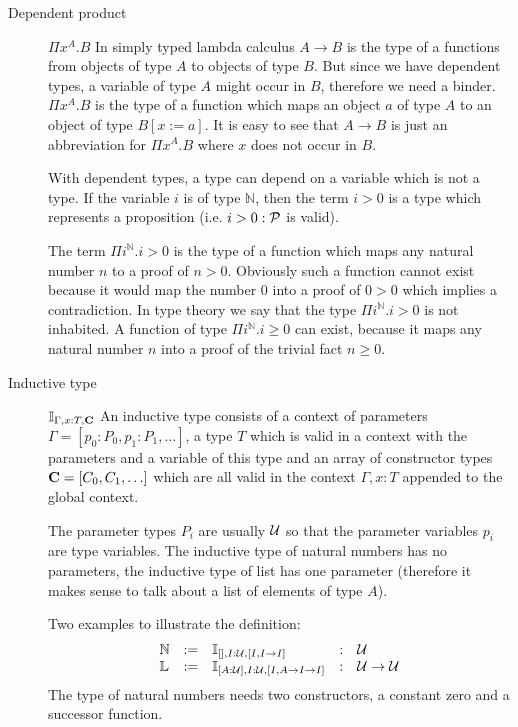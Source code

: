 \begin{description}
\item[Dependent product] $\Pi x^A.B$ In simply typed lambda calculus
  $A \to B$ is the type of a functions from objects of type $A$ to objects of
  type $B$. But since we have dependent types, a variable of type $A$ might
  occur in $B$, therefore we need a binder. $\Pi x^A. B$ is the type of a
  function which maps an object $a$ of type $A$ to an object of type
  $B[x:=a]$. It is easy to see that $A \to B$ is just an abbreviation for
  $\Pi x^A.B$ where $x$ does not occur in $B$.

  With dependent types, a type can depend on a variable which is not a
  type. If the variable $i$ is of type $\mathbb{N}$, then the term $i > 0$ is
  a type which represents a proposition (i.e. $i > 0: {\cal{P}}$ is valid).

  The term $\Pi i^{\mathbb{N}}. i > 0$ is the type of a function which maps
  any natural number $n$ to a proof of $n > 0$. Obviously such a function
  cannot exist because it would map the number $0$ into a proof of $0 > 0$
  which implies a contradiction. In type theory we say that the type
  $\Pi i^{\mathbb{N}}. i > 0$ is not inhabited. A function of type
  $\Pi i^{\mathbb{N}}. i \ge 0$ can exist, because it maps any natural number
  $n$ into a proof of the trivial fact $n \ge 0$.

\item[Inductive type] $\mathbb{I}_{\Gamma,x:T,\mathbf{C}}$ An inductive type
  consists of a context of parameters $\Gamma = [p_0:P_0, p_1:P_1, \ldots]$, a
  type $T$ which is valid in a context with the parameters and a variable of
  this type and an array of constructor types $\mathbf{C} = [C_0, C_1, \ldots]$
  which are all valid in the context $\Gamma, x:T$ appended to the global
  context.

  The parameter types $P_i$ are usually ${\cal{U}}$ so that the parameter variables
  $p_i$ are type variables. The inductive type of natural numbers has no
  parameters, the inductive type of list has one parameter (therefore it makes
  sense to talk about a list of elements of type $A$).

  Two examples to illustrate the definition:
  $$
  \begin{array}{lllll}
    \mathbb{N}
    &:=& \mathbb{I}_{[], I:{\cal{U}}, [I, I \to I]}
    &:& {\cal{U}}
    \\
    \mathbb{L}
    &:=& \mathbb{I}_{[A:{\cal{U}}],  I:{\cal{U}},  [I, A \to I \to I]}
    &:& {\cal{U}} \to {\cal{U}}
  \end{array}
  $$
  The type of natural numbers needs two constructors, a constant zero and a
  successor function.


\end{description}
